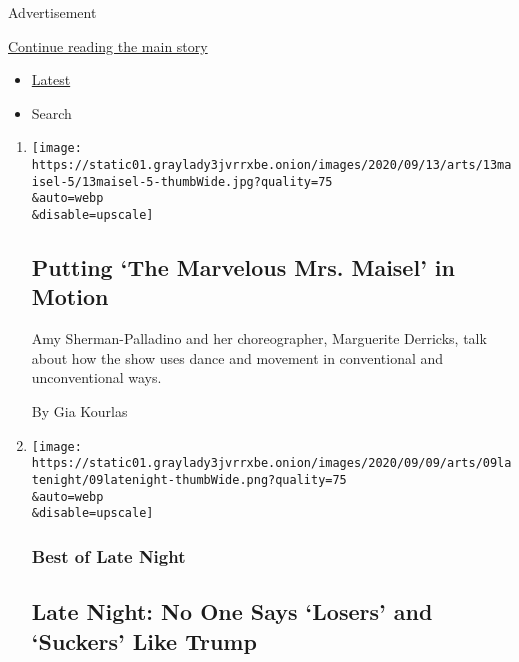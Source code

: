 Advertisement

\protect\hyperlink{after-mid1}{Continue reading the main story}

\begin{itemize}
\tightlist
\item
  \protect\hyperlink{stream-panel}{Latest}
\item
  Search
\end{itemize}

\begin{enumerate}
\def\labelenumi{\arabic{enumi}.}
\item
  \href{/2020/09/09/arts/dance/mrs-maisel-amy-sherman-palladino-marguerite-derricks.html}{}

  \texttt{[image: https://static01.graylady3jvrrxbe.onion/images/2020/09/13/arts/13maisel-5/13maisel-5-thumbWide.jpg?quality=75\\\&auto=webp\\\&disable=upscale]}

  \hypertarget{putting-the-marvelous-mrs-maisel-in-motion}{%
  \subsection{Putting `The Marvelous Mrs. Maisel' in
  Motion}\label{putting-the-marvelous-mrs-maisel-in-motion}}

  Amy Sherman-Palladino and her choreographer, Marguerite Derricks, talk
  about how the show uses dance and movement in conventional and
  unconventional ways.

  By Gia Kourlas
\item
  \href{/2020/09/09/arts/television/late-night-trump-losers-suckers.html}{}

  \texttt{[image: https://static01.graylady3jvrrxbe.onion/images/2020/09/09/arts/09latenight/09latenight-thumbWide.png?quality=75\\\&auto=webp\\\&disable=upscale]}

  \hypertarget{best-of-late-night}{%
  \subsubsection{Best of Late Night}\label{best-of-late-night}}

  \hypertarget{late-night-no-one-says-losers-and-suckers-like-trump}{%
  \subsection{Late Night: No One Says `Losers' and `Suckers' Like
  Trump}\label{late-night-no-one-says-losers-and-suckers-like-trump}}


\end{enumerate}
